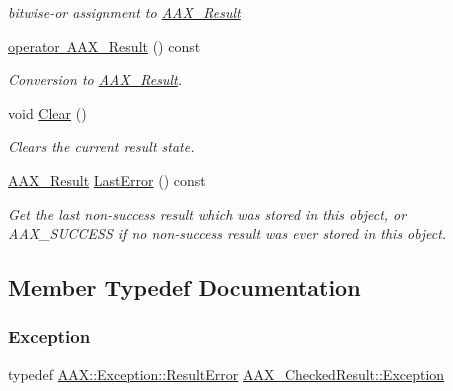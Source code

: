 \begin{DoxyCompactItemize}
\begin{DoxyCompactList}\small\item\em bitwise-\/or assignment to \mbox{\hyperlink{a00392_a4d8f69a697df7f70c3a8e9b8ee130d2f}{A\+A\+X\+\_\+\+Result}} \end{DoxyCompactList}\item 
\mbox{\hyperlink{a01601_a3f35266c39cfcf4211dbaacbf64fc3f8}{operator A\+A\+X\+\_\+\+Result}} () const
\begin{DoxyCompactList}\small\item\em Conversion to \mbox{\hyperlink{a00392_a4d8f69a697df7f70c3a8e9b8ee130d2f}{A\+A\+X\+\_\+\+Result}}. \end{DoxyCompactList}\item 
void \mbox{\hyperlink{a01601_abacea9ed08e64315cb984fa630815dd7}{Clear}} ()
\begin{DoxyCompactList}\small\item\em Clears the current result state. \end{DoxyCompactList}\item 
\mbox{\hyperlink{a00392_a4d8f69a697df7f70c3a8e9b8ee130d2f}{A\+A\+X\+\_\+\+Result}} \mbox{\hyperlink{a01601_af0e297a396bf7ea3dfcdc7f71d85486f}{Last\+Error}} () const
\begin{DoxyCompactList}\small\item\em Get the last non-\/success result which was stored in this object, or A\+A\+X\+\_\+\+S\+U\+C\+C\+E\+SS if no non-\/success result was ever stored in this object. \end{DoxyCompactList}\end{DoxyCompactItemize}


\subsection{Member Typedef Documentation}
\mbox{\label{a01601_a36fd71afc6d62993c1dd96e1ca9fcc0e}} 
\subsubsection{\texorpdfstring{Exception}{Exception}}
{\footnotesize\ttfamily typedef \mbox{\hyperlink{a01597}{A\+A\+X\+::\+Exception\+::\+Result\+Error}} \mbox{\hyperlink{a01601_a36fd71afc6d62993c1dd96e1ca9fcc0e}{A\+A\+X\+\_\+\+Checked\+Result\+::\+Exception}}}



